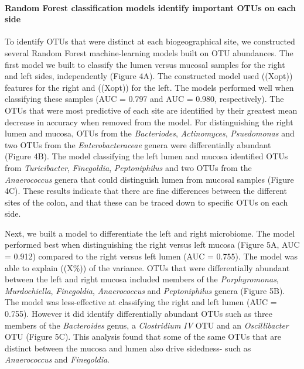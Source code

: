\documentclass[11pt,]{article}
\let\oldparagraph\paragraph
\renewcommand{\paragraph}[1]{\oldparagraph{#1}\mbox{}}
\begin{document}
\paragraph{Random Forest classification models identify important OTUs
on each
side}\label{random-forest-classification-models-identify-important-otus-on-each-side}

To identify OTUs that were distinct at each biogeographical site, we
constructed several Random Forest machine-learning models built on OTU
abundances. The first model we built to classify the lumen versus
mucosal samples for the right and left sides, independently (Figure 4A).
The constructed model used ((Xopt)) features for the right and ((Xopt))
for the left. The models performed well when classifying these samples
(AUC = 0.797 and AUC = 0.980, respectively). The OTUs that were most
predictive of each site are identified by their greatest mean decrease
in accuracy when removed from the model. For distinguishing the right
lumen and mucosa, OTUs from the \emph{Bacteriodes}, \emph{Actinomyces},
\emph{Psuedomonas} and two OTUs from the \emph{Enterobacteraceae} genera
were differentially abundant (Figure 4B). The model classifying the left
lumen and mucosa identified OTUs from \emph{Turicibacter},
\emph{Finegoldia}, \emph{Peptoniphilus} and two OTUs from the
\emph{Anaerococcus} genera that could distinguish lumen from mucosal
samples (Figure 4C). These results indicate that there are fine
differences between the different sites of the colon, and that these can
be traced down to specific OTUs on each side.

Next, we built a model to differentiate the left and right microbiome.
The model performed best when distinguishing the right versus left
mucosa (Figure 5A, AUC = 0.912) compared to the right versus left lumen
(AUC = 0.755). The model was able to explain ((X\%)) of the variance.
OTUs that were differentially abundant between the left and right mucosa
included members of the \emph{Porphyromonas}, \emph{Murdochiella},
\emph{Finegoldia}, \emph{Anaerococcus} and \emph{Peptoniphilus} genera
(Figure 5B). The model was less-effective at classifying the right and
left lumen (AUC = 0.755). However it did identify differentially
abundant OTUs such as three members of the \emph{Bacteroides} genus, a
\emph{Clostridium IV} OTU and an \emph{Oscillibacter} OTU (Figure 5C).
This analysis found that some of the same OTUs that are distinct between
the mucosa and lumen also drive sidedness- such as \emph{Anaerococcus}
and \emph{Finegoldia}.
\end{document}
